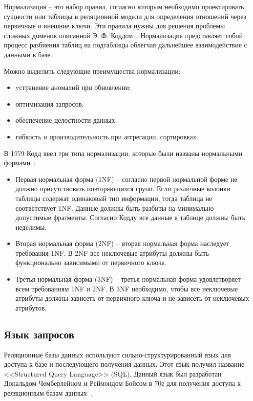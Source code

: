 Нормализация -- это набор правил, согласно которым необходимо 
проектировать сущности или таблицы в реляционной модели для определения отношений через
первичные и внешние ключи. Эти правила нужны для решения проблемы сложных доменов
описанной Э. Ф. Коддом~\cite{Codd_Relational}.
Нормализация представляет собой процесс разбиения таблиц на подтаблицы облегчая
дальнейшее взаимодействие с данными в базе.

Можно выделить следующие преимущества нормализации:
\begin{itemize}[label=---]
    \item yстранение аномалий при обновлении;
    \item оптимизация запросов;
    \item обеспечение целостности данных;  
    \item гибкость и производительность при аггрегации, сортировках.
\end{itemize}

В 1979 Кодд ввел три типа нормализации, которые были названы нормальными формами~\cite{Codd_NF}:
\begin{itemize}[label=---]

  \item Первая нормальная форма (1NF) -- согласно первой нормальной форме 
    не должно присутствовать повторяющихся групп.
    Если различные колонки таблицы содержат одинаковый тип информации,
    тогда таблица не соответствует 1NF.
    Данные должны быть разбиты на минимально допустимые фрагменты.
    Согласно Кодду все данные в таблице должны быть неделимы.
    
    \item Вторая нормальная форма (2NF) -- вторая нормальная форма наследует требования 1NF.
    В 2NF все неключевые атрибуты должны быть функционально зависимыми от первичного ключа.
    
    \item Третья нормальная форма (3NF) -- третья нормальная форма удовлетворяет всем требованиям 1NF и 2NF.
    В 3NF необходимо, чтобы все неключевые атрибуты должны зависеть от первичного ключа и не зависеть от неключевых атрибутов.

  \end{itemize}


\subsection{Язык запросов}

Реляционные базы данных используют сильно-структурированный язык для доступа к базе и последующего получения данных.
Этот язык получил название <<Structured Query Language>> (SQL).
Данный язык был разработан Дональдом Чемберлейном и Реймондом Бойсом в 70е для получения доступа к реляционным базам данных~\cite{SQL}.

